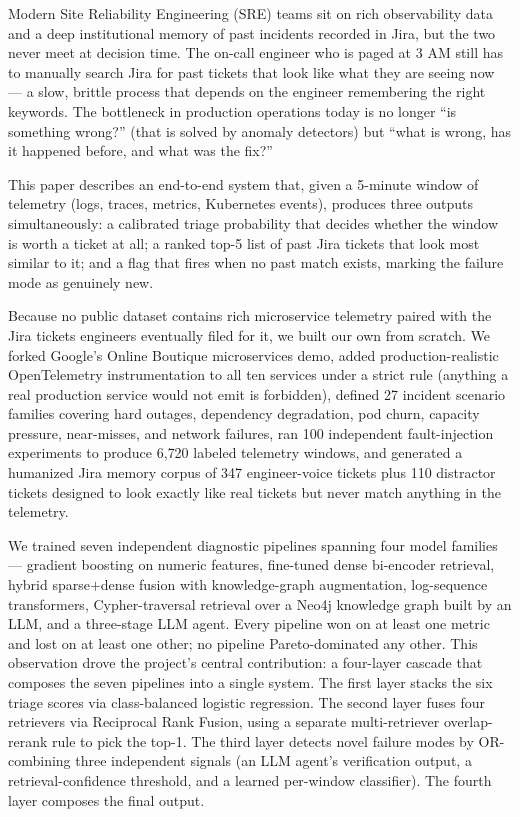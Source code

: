 Modern Site Reliability Engineering (SRE) teams sit on rich observability data and a deep institutional memory of past incidents recorded in Jira, but the two never meet at decision time. The on-call engineer who is paged at 3 AM still has to manually search Jira for past tickets that look like what they are seeing now --- a slow, brittle process that depends on the engineer remembering the right keywords. The bottleneck in production operations today is no longer ``is something wrong?'' (that is solved by anomaly detectors) but ``what is wrong, has it happened before, and what was the fix?''

This paper describes an end-to-end system that, given a 5-minute window of telemetry (logs, traces, metrics, Kubernetes events), produces three outputs simultaneously: a calibrated triage probability that decides whether the window is worth a ticket at all; a ranked top-5 list of past Jira tickets that look most similar to it; and a flag that fires when no past match exists, marking the failure mode as genuinely new.

Because no public dataset contains rich microservice telemetry paired with the Jira tickets engineers eventually filed for it, we built our own from scratch. We forked Google's Online Boutique microservices demo, added production-realistic OpenTelemetry instrumentation to all ten services under a strict rule (anything a real production service would not emit is forbidden), defined 27 incident scenario families covering hard outages, dependency degradation, pod churn, capacity pressure, near-misses, and network failures, ran 100 independent fault-injection experiments to produce 6{,}720 labeled telemetry windows, and generated a humanized Jira memory corpus of 347 engineer-voice tickets plus 110 distractor tickets designed to look exactly like real tickets but never match anything in the telemetry.

We trained seven independent diagnostic pipelines spanning four model families --- gradient boosting on numeric features, fine-tuned dense bi-encoder retrieval, hybrid sparse$+$dense fusion with knowledge-graph augmentation, log-sequence transformers, Cypher-traversal retrieval over a Neo4j knowledge graph built by an LLM, and a three-stage LLM agent. Every pipeline won on at least one metric and lost on at least one other; no pipeline Pareto-dominated any other. This observation drove the project's central contribution: a four-layer cascade that composes the seven pipelines into a single system. The first layer stacks the six triage scores via class-balanced logistic regression. The second layer fuses four retrievers via Reciprocal Rank Fusion, using a separate multi-retriever overlap-rerank rule to pick the top-1. The third layer detects novel failure modes by OR-combining three independent signals (an LLM agent's verification output, a retrieval-confidence threshold, and a learned per-window classifier). The fourth layer composes the final output.

